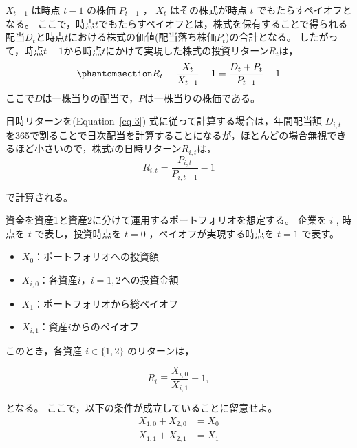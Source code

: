 \documentclass[
  letterpaper,
  pandoc,
  ja=standard,
  jafont = hiragino-pron]{ltjsbook}
\providecommand{\tightlist}{%
  \setlength{\itemsep}{0pt}\setlength{\parskip}{0pt}}\usepackage{longtable,booktabs,array}
\begin{document}
\begin{tcolorbox}[enhanced jigsaw, colframe=quarto-callout-note-color-frame, breakable, rightrule=.15mm, coltitle=black, title=\textcolor{quarto-callout-note-color}{\faInfo}\hspace{0.5em}{例2 : 株式}, colbacktitle=quarto-callout-note-color!10!white, leftrule=.75mm, colback=white, left=2mm, arc=.35mm, opacityback=0, titlerule=0mm, toptitle=1mm, bottomtitle=1mm, bottomrule=.15mm, toprule=.15mm, opacitybacktitle=0.6]

\(X_{t-1}\) は時点 \(t-1\) の株価 \(P_{t-1}\) ， \(X_t\)
はその株式が時点 \(t\) でもたらすペイオフとなる。
ここで，時点\(t\)でもたらすペイオフとは，株式を保有することで得られる配当\(D_t\)と時点\(t\)における株式の価値(配当落ち株価\(P_t\))の合計となる。
したがって，時点\(t-1\)から時点\(t\)にかけて実現した株式の投資リターン\(R_t\)は，
\begin{equation}\phantomsection\label{eq-3}{
R_t \equiv \frac{X_t}{X_{t-1}} - 1 = \frac{D_t + P_t}{P_{t-1}} -1
}\end{equation}
ここで\(D\)は一株当りの配当で，\(P\)は一株当りの株価である。

日時リターンを(Equation~\ref{eq-3}) 式に従って計算する場合は，年間配当額
\(D_{i,t}\)
を365で割ることで日次配当を計算することになるが，ほとんどの場合無視できるほど小さいので，株式\(i\)の日時リターン\(R_{i,t}\)は，
\[
R_{i,t} = \frac{P_{i,t}}{P_{i,t-1}} - 1
\]

で計算される。

\end{tcolorbox}

資金を資産1と資産2に分けて運用するポートフォリオを想定する。 企業を
\(i\) , 時点を \(t\) で表し，投資時点を \(t=0\)
，ペイオフが実現する時点を \(t=1\) で表す。

\begin{itemize}
\tightlist
\item
  \(X_0\)：ポートフォリオへの投資額
\item
  \(X_{i,0}\)：各資産\(i\)，\(i = 1,2\)への投資金額
\item
  \(X_1\)：ポートフォリオから総ペイオフ
\item
  \(X_{i,1}\)：資産\(i\)からのペイオフ
\end{itemize}

このとき，各資産 \(i \in \{1,2\}\) のリターンは，

\[
R_t \equiv \frac{X_{i,0}}{X_{i,1}} -1,%
\]

となる。 ここで，以下の条件が成立していることに留意せよ。 \[
\begin{aligned}
X_{1,0}  + X_{2,0} &= X_0\\
X_{1,1}  + X_{2,1} &= X_1
\end{aligned}
\]
\end{document}
